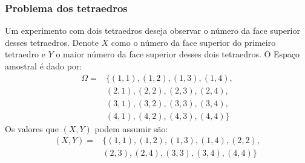 \documentclass{beamer}
\theoremstyle{plain}
\begin{document}
\begin{frame}
	\frametitle{Problema dos tetraedros}
    Um experimento com dois tetraedros deseja observar o número da face superior desses tetraedros. Denote $X$ como o número da face superior do primeiro tetraedro e $Y$ o maior número da face superior desses dois tetraedros. O Espaço amostral é dado por:
    \begin{align*}
    \Omega = & \{(1,1), (1,2), (1,3), (1,4), \\
    & (2,1), (2,2), (2,3), (2,4), \\
    & (3,1), (3,2), (3,3), (3,4), \\
    & (4,1), (4,2), (4,3), (4,4)\}
    \end{align*}\pause
    Os valores que $(X, Y)$ podem assumir são:
    \begin{align*}
    (X, Y) = & \{(1,1), (1,2), (1,3), (1,4), (2,2), \\
             & (2,3), (2,4),(3,3), (3,4), (4,4)\}
    \end{align*}
\end{frame}
\end{document}

